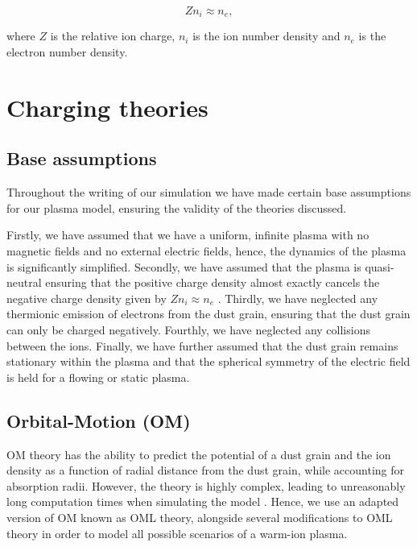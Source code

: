 \documentclass[journal]{Imperial_lab_report}
\begin{document}
\begin{equation}\label{eq:Quasi-neutrality}
{Z n_i \approx n_e},
\end{equation}

\noindent where $Z$ is the relative ion charge, $n_i$ is the ion number density and $n_e$ is the electron number density. 

\section{Charging theories}

\subsection{Base assumptions}

Throughout the writing of our simulation we have made certain base assumptions for our plasma model, ensuring the validity of the theories discussed.

\smallskip 

\noindent Firstly, we have assumed that we have a uniform, infinite plasma with no magnetic fields and no external electric fields, hence, the dynamics of the plasma is significantly simplified. Secondly, we have assumed that the plasma is quasi-neutral ensuring that the positive charge density almost exactly cancels the negative charge density given by $Zn_{i} \approx n_{e}$ \cite{Thomas}. Thirdly, we have neglected any thermionic emission of electrons from the dust grain, ensuring that the dust grain can only be charged negatively. Fourthly, we have neglected any collisions between the ions. Finally, we have further assumed that the dust grain remains stationary within the plasma and that the spherical symmetry of the electric field is held for a flowing or static plasma.

\subsection{Orbital-Motion (OM)}

OM theory has the ability to predict the potential of a dust grain and the ion density as a function of radial distance from the dust grain, while accounting for absorption radii. However, the theory is highly complex, leading to unreasonably long computation times when simulating the model \cite{Thomas}. Hence, we use an adapted version of OM known as OML theory, alongside several modifications to OML theory in order to model all possible scenarios of a warm-ion plasma.
\end{document}
